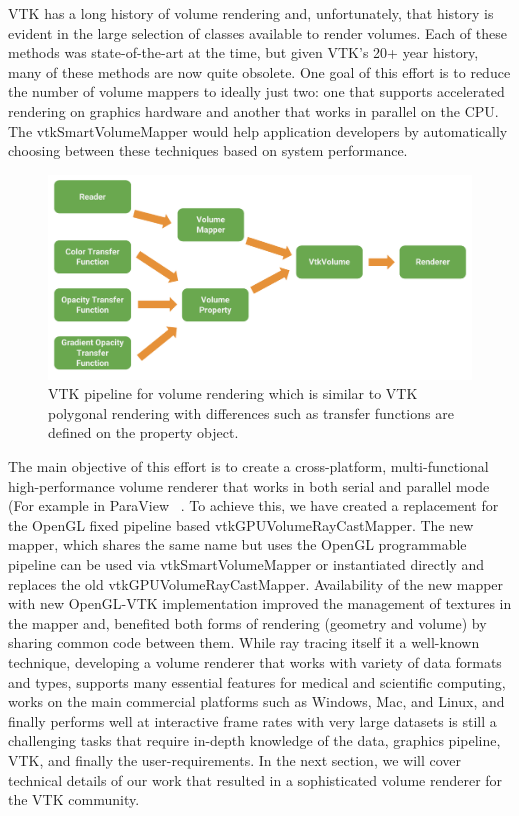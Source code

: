 VTK has a long history of volume rendering and, unfortunately, that history is evident in the large selection of classes available to render volumes. Each of these methods was state-of-the-art at the time, but given VTK’s 20+ year history, many of these methods are now quite obsolete. One goal of this effort is to reduce the number of volume mappers to ideally just two: one that supports accelerated rendering on graphics hardware and another that works in parallel on the CPU. The vtkSmartVolumeMapper would help application developers by automatically choosing between these techniques based on system performance. 

\begin{figure}
\centering
\includegraphics[width=1\linewidth]{vtk_volume_pipeline.pdf}
\caption{VTK pipeline for volume rendering which is similar to VTK polygonal rendering with differences such as transfer functions are defined on the property object.}
\label{fig:pipeline}
\end{figure}

The main objective of this effort is to create a cross-platform, multi-functional high-performance volume renderer that works in both serial and parallel mode (For example in ParaView ~\cite{paraview}. To achieve this, we have created a replacement for the OpenGL fixed pipeline based vtkGPUVolumeRayCastMapper. The new mapper, which shares the same name but uses the OpenGL programmable pipeline can be used via vtkSmartVolumeMapper or instantiated directly and replaces the old vtkGPUVolumeRayCastMapper. Availability of the new mapper with new OpenGL-VTK implementation improved the management of textures in the mapper and, benefited both forms of rendering (geometry and volume) by sharing common code between them. While ray tracing itself it a well-known technique, developing a volume renderer that works with variety of data formats and types, supports many essential features for medical and scientific computing, works on the main commercial platforms such as Windows, Mac, and Linux, and finally performs well at interactive frame rates with very large datasets is still a challenging tasks that require in-depth knowledge of the data, graphics pipeline, VTK, and finally the user-requirements. In the next section, we will cover technical details of our work that resulted in a sophisticated volume renderer for the VTK community.